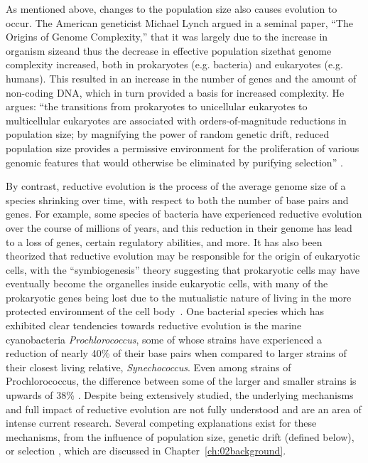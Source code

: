 As mentioned above, changes to the population size also causes evolution to occur. The American geneticist Michael Lynch argued in a seminal paper, ``The Origins of Genome Complexity,'' that it was largely due to the increase in organism size\textemdash and thus the decrease in effective population size\textemdash that genome complexity increased, both in prokaryotes (e.g. bacteria) and eukaryotes (e.g. humans). This resulted in an increase in the number of genes and the amount of non-coding DNA, which in turn provided a basis for increased complexity. He argues: ``the transitions from prokaryotes to unicellular eukaryotes to multicellular eukaryotes are associated with orders-of-magnitude reductions in population size; by magnifying the power of random genetic drift, reduced population size provides a permissive environment for the proliferation of various genomic features that would otherwise be eliminated by purifying selection'' \cite{Lynch1401}. 

By contrast, reductive evolution is the process of the average genome size of a species shrinking over time, with respect to both the number of base pairs and genes. For example, some species of bacteria have experienced reductive evolution over the course of millions of years, and this reduction in their genome has lead to a loss of genes, certain regulatory abilities, and more. It has also been theorized that reductive evolution may be responsible for the origin of eukaryotic cells, with the ``symbiogenesis'' theory suggesting that prokaryotic cells may have eventually become the organelles inside eukaryotic cells, with many of the prokaryotic genes being lost due to the mutualistic nature of living in the more protected environment of the cell body~\cite{sagan1967origin}. One bacterial species which has exhibited clear tendencies towards reductive evolution is the marine cyanobacteria \textit{Prochlorococcus}, some of whose strains have experienced a reduction of nearly 40\% of their base pairs when compared to larger strains of their closest living relative, \textit{Synechococcus}. Even among strains of Prochlorococcus, the difference between some of the larger and smaller strains is upwards of 38\% \cite{Batut.2014}. Despite being extensively studied, the underlying mechanisms and full impact of reductive evolution are not fully understood and are an area of intense current research. Several competing explanations exist for these mechanisms, from the influence of population size, genetic drift (defined below), or selection \cite{Batut.2014}, which are discussed in Chapter~\ref{ch:02background}.

